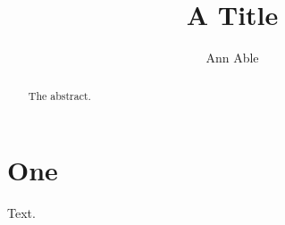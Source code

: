 \documentclass{autart}
\begin{document}
\begin{frontmatter}
\title{A Title}
\author[a]{Ann Able}
\address[a]{First University}
\begin{abstract}The abstract.\end{abstract}
\end{frontmatter}
\section{One}
Text.
\end{document}
